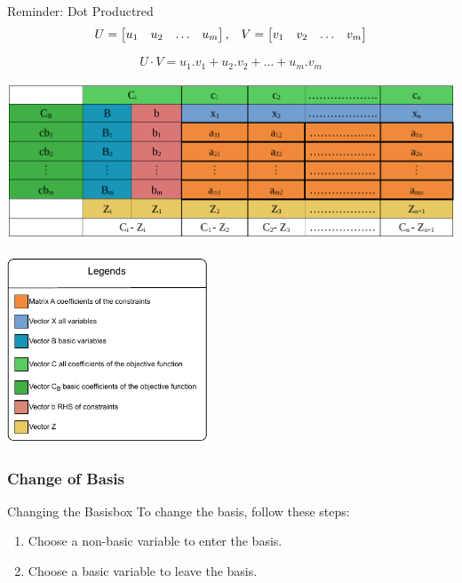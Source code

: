 \vspace{0.5cm}

\begin{prettyBox}{Reminder: Dot Product}{red}
    \[U = \left[\begin{matrix} u_1 & u_2 & \dots & u_m \end{matrix}\right] ,
\hspace{0.3cm}
    V = \left[\begin{matrix} v_1 & v_2 & \dots & v_m \end{matrix}\right]\]

\vspace{0.15cm}
\[U \cdot V = u_1.v_1 + u_2.v_2 + \dots + u_m.v_m\]
\end{prettyBox}

\begin{center}
    \includegraphics{Chapters/Simplexe/table.pdf}
\end{center}

\vspace{0.25cm}

\begin{center}
    \includegraphics[width=0.45\textwidth]{Chapters/Simplexe/leg.drawio.pdf}
\end{center}

\subsubsection{Change of Basis}
\begin{prettyBox}{Changing the Basis}{box}
To change the basis, follow these steps:
\begin{enumerate}
    \item Choose a non-basic variable to enter the basis.
    \item Choose a basic variable to leave the basis.
\end{enumerate}
\end{prettyBox}


